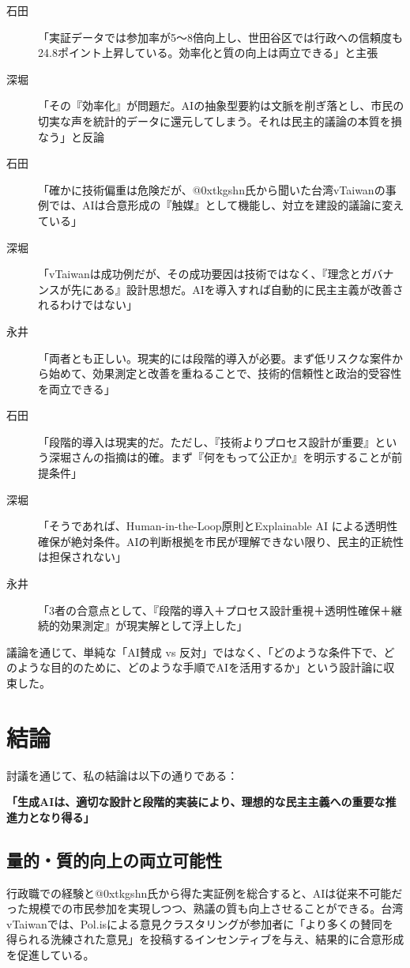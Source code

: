 \documentclass[12pt,a4j]{jarticle}
\begin{document}
\begin{description}
\item[石田] 「実証データでは参加率が5～8倍向上し、世田谷区では行政への信頼度も24.8ポイント上昇している\cite{setagaya2023}。効率化と質の向上は両立できる」と主張
\item[深堀] 「その『効率化』が問題だ。AIの抽象型要約は文脈を削ぎ落とし、市民の切実な声を統計的データに還元してしまう。それは民主的議論の本質を損なう\cite{panditharatne2023}」と反論
\item[石田] 「確かに技術偏重は危険だが、@0xtkgshn氏から聞いた台湾vTaiwanの事例では、AIは合意形成の『触媒』として機能し、対立を建設的議論に変えている\cite{cui2024}」
\item[深堀] 「vTaiwanは成功例だが、その成功要因は技術ではなく、『理念とガバナンスが先にある』設計思想だ。AIを導入すれば自動的に民主主義が改善されるわけではない」
\item[永井] 「両者とも正しい。現実的には段階的導入が必要。まず低リスクな案件から始めて、効果測定と改善を重ねることで、技術的信頼性と政治的受容性を両立できる」
\item[石田] 「段階的導入は現実的だ。ただし、『技術よりプロセス設計が重要』という深堀さんの指摘は的確。まず『何をもって公正か』を明示することが前提条件」
\item[深堀] 「そうであれば、Human-in-the-Loop原則とExplainable AI による透明性確保が絶対条件。AIの判断根拠を市民が理解できない限り、民主的正統性は担保されない」
\item[永井] 「3者の合意点として、『段階的導入＋プロセス設計重視＋透明性確保＋継続的効果測定』が現実解として浮上した」
\end{description}

議論を通じて、単純な「AI賛成 vs 反対」ではなく、「どのような条件下で、どのような目的のために、どのような手順でAIを活用するか」という設計論に収束した。

\section{結論}

討議を通じて、私の結論は以下の通りである：

\textbf{「生成AIは、適切な設計と段階的実装により、理想的な民主主義への重要な推進力となり得る」}

\subsection{量的・質的向上の両立可能性}
行政職での経験と@0xtkgshn氏から得た実証例を総合すると、AIは従来不可能だった規模での市民参加を実現しつつ、熟議の質も向上させることができる。台湾vTaiwanでは、Pol.isによる意見クラスタリングが参加者に「より多くの賛同を得られる洗練された意見」を投稿するインセンティブを与え、結果的に合意形成を促進している\cite{tsai2024}。
\end{document}
